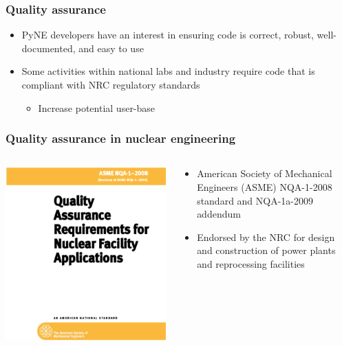 \documentclass[12pt]{beamer}
\begin{document}
\begin{frame}[fragile]
\frametitle{Quality assurance}

\begin{itemize}
\item{PyNE developers have an interest in ensuring code is correct, robust,
well-documented, and easy to use}
\item{Some activities within national labs and industry require code that is compliant with NRC regulatory standards}
\begin{itemize}
\item{Increase potential user-base}
\end{itemize}
\end{itemize}

\end{frame}
\begin{frame}[fragile]
\frametitle{Quality assurance in nuclear engineering}

\begin{columns}[T]
\begin{column}{0.5\textwidth}
\includegraphics[width=\textwidth]{figures/nqa-1-2008.png}
\end{column}
\begin{column}{0.5\textwidth}
\begin{itemize}
\item{American Society of Mechanical Engineers (ASME)
NQA-1-2008 \cite{nqa} standard and NQA-1a-2009 \cite{add} addendum}
\item{Endorsed by the NRC for design and construction of power plants and reprocessing facilities}
\end{itemize}
\end{column}
\end{columns}


\end{frame}
\end{document}
